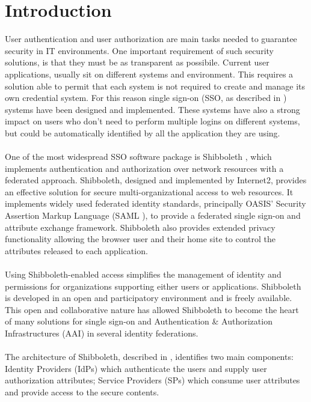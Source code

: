 \label{sec:introduction}
\section{Introduction}
User authentication and user authorization are main tasks needed to guarantee security in IT environments.
One important requirement of such security solutions, is that they must be as transparent as possibile.
Current user applications, usually sit on different systems and environment.
This requires a solution able to permit that each system is not required to create and manage its own credential system.
For this reason single sign-on (SSO, as described in \cite{Shaer-1995}) systems have been designed and implemented.
These systems have also a strong impact on users who don't need to perform multiple logins on different systems, but could be automatically identified by all the
application they are using.\\
\\
One of the most widespread SSO software package is Shibboleth \cite{Morgan-2004}, which implements authentication and authorization over network resources with a federated
approach.
Shibboleth, designed and implemented by Internet2, provides an effective solution for secure multi-organizational access to web resources.
It implements widely used federated identity standards, principally OASIS' Security Assertion Markup Language (SAML \cite{Cantor-2005}), to provide a federated single
sign-on and attribute exchange framework.
Shibboleth also provides extended privacy functionality allowing the browser user and their home site to control the attributes released to each application.\\
\\
Using Shibboleth-enabled access simplifies the management of identity and permissions for organizations supporting either users or applications.
Shibboleth is developed in an open and participatory environment and is freely available.
This open and collaborative nature has allowed Shibboleth to become the heart of many solutions for single sign-on and Authentication \& Authorization Infrastructures (AAI)
in several identity federations.\\
\\
The architecture of Shibboleth, described in \cite{Erdos-2005}, identifies two main components: Identity Providers (IdPs) which authenticate the users and supply user 
authorization attributes; Service Providers (SPs) which consume user attributes and provide access to the secure contents.\\
